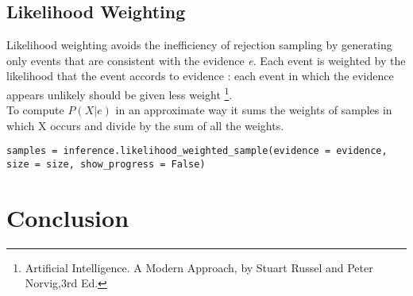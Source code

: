 \documentclass[letterpaper,11pt]{article}
\begin{document}
\subsection{Likelihood Weighting}

Likelihood weighting avoids the inefficiency of rejection sampling by generating only events that are consistent with the evidence \textit{e}.
Each event is weighted by the likelihood that the event accords to evidence : each event in which the evidence appears unlikely should be given less weight \footnote{Artificial Intelligence. A Modern Approach, by Stuart Russel and Peter
Norvig,3rd Ed.}. \\To compute $P(X| e)$ in an approximate way it sums the weights of samples in which X occurs and divide by the sum of all the weights.

\begin{lstlisting}
samples = inference.likelihood_weighted_sample(evidence = evidence, size = size, show_progress = False)
\end{lstlisting}


\section{Conclusion}
\end{document}
